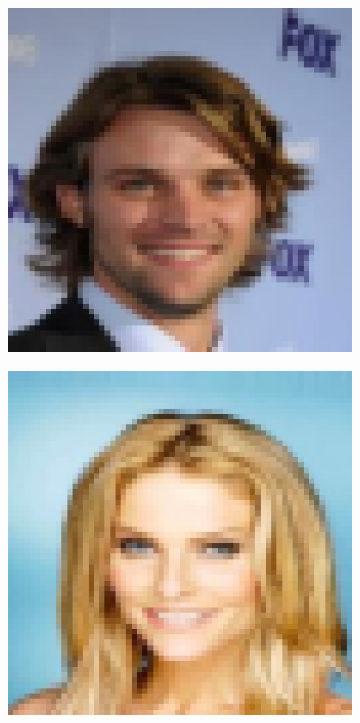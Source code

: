 \documentclass{IEEEcsmag}
\begin{document}
\begin{figure}[ht]
\setcounter{subfigure}{0}
    \centering
    \begin{subfigure}{0.12\textwidth}
        \includegraphics[width=\linewidth]{images/CelebA/1/original_4.png}
    \end{subfigure}
    \begin{subfigure}{0.12\textwidth}
        \includegraphics[width=\linewidth]{images/CelebA/1/original_2.png}

\end{subfigure}
\end{figure}
\end{document}
